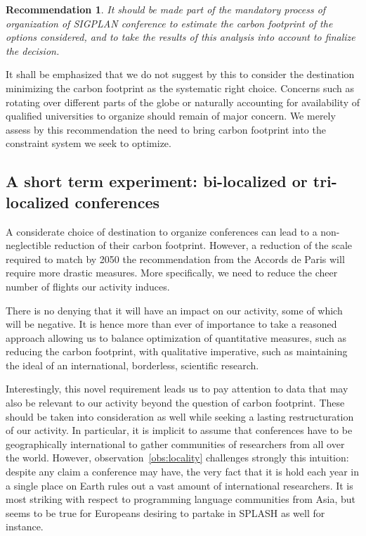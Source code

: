 \documentclass[manuscript, review, screen]{acmart}
\newtheorem{recommend}{Recommendation}
\begin{document}
\begin{recommend}
It should be made part of the mandatory process of organization of SIGPLAN
conference to estimate the carbon footprint of the options considered, and
to take the results of this analysis into account to finalize the decision.
\end{recommend}

It shall be emphasized that we do not suggest by this to consider the destination
minimizing the carbon footprint as the systematic right choice. Concerns such as
rotating over different parts of the globe or naturally accounting for availability
of qualified universities to organize should remain of major concern. We merely
assess by this recommendation the need to bring carbon footprint into the constraint
system we seek to optimize.

\subsection{A short term experiment: bi-localized or tri-localized conferences}

A considerate choice of destination to organize conferences can lead to a
non-neglectible reduction of their carbon footprint. However, a reduction of
the scale required to match by 2050 the recommendation from the Accords de Paris
will require more drastic measures. More specifically, we need to reduce the cheer
number of flights our activity induces.

There is no denying that it will have an impact on our activity, some of which will
be negative. It is hence more than ever of importance to take a reasoned approach
allowing us to balance optimization of quantitative measures, such as reducing the
carbon footprint, with qualitative imperative, such as maintaining the ideal of
an international, borderless, scientific research.

Interestingly, this novel requirement leads us to pay attention to data that may also be
relevant to our activity beyond the question of carbon footprint. These should be
taken into consideration as well while seeking a lasting restructuration of our
activity. In particular, it is implicit to assume that conferences have to be
geographically international to gather communities of researchers from all over the
world. However, observation~\ref{obs:locality} challenges strongly this intuition:
despite any claim a conference may have, the very fact that it is hold each year in
a single place on Earth rules out a vast amount of international researchers. It is most
striking with respect to programming language communities from Asia, but seems to be
true for Europeans desiring to partake in SPLASH as well for instance.
\end{document}
